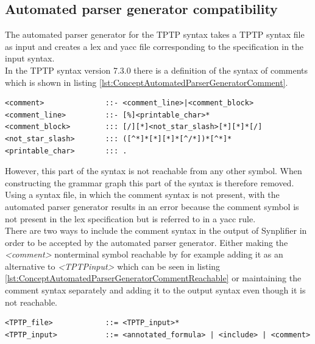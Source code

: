 \subsection{Automated parser generator compatibility}\label{sec:ConceptAutomatedParserGenerator}

The automated parser generator for the \ac{TPTP} syntax \cite{VS06} takes a \ac{TPTP} syntax file as input and creates a lex and yacc file corresponding to the specification in the input syntax.\\
In the \ac{TPTP} syntax version 7.3.0 there is a definition of the syntax of comments which is shown in listing \ref{lst:ConceptAutomatedParserGeneratorComment}.
\begin{lstlisting}[language=none, basicstyle=\scriptsize, caption=Comment syntax definition in the \ac{TPTP} syntax, label= lst:ConceptAutomatedParserGeneratorComment]
<comment>              ::- <comment_line>|<comment_block> 
<comment_line>         ::- [%]<printable_char>*
<comment_block>        ::: [/][*]<not_star_slash>[*][*]*[/]
<not_star_slash>       ::: ([^*]*[*][*]*[^/*])*[^*]*
<printable_char>       ::: .
\end{lstlisting}

However, this part of the syntax is not reachable from any other symbol.
When constructing the grammar graph this part of the syntax is therefore removed.\\
Using a syntax file, in which the comment syntax is not present, with the automated parser generator results in an error because the comment symbol is not present in the lex specification but is referred to in a yacc rule.\\
There are two ways to include the comment syntax in the output of \ac{Synplifier} in order to be accepted by the automated parser generator.
Either making the \textit{<comment>} nonterminal symbol reachable by for example adding it as an alternative to \textit{<TPTP\textunderscore input>} which can be seen in listing \ref{lst:ConceptAutomatedParserGeneratorCommentReachable} or maintaining the comment syntax separately and adding it to the output syntax even though it is not reachable.
\begin{lstlisting}[language=none, basicstyle=\scriptsize, caption=Making the comment syntax reachable, label= lst:ConceptAutomatedParserGeneratorCommentReachable]
<TPTP_file>            ::= <TPTP_input>*
<TPTP_input>           ::= <annotated_formula> | <include> | <comment>
\end{lstlisting}

